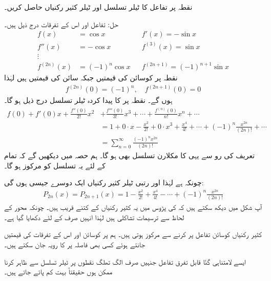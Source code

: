 نقطہ  پر تفاعل  کا ٹیلر تسلسل اور ٹیلر کثیر رکنیاں حاصل کریں۔

حل:\quad
تفاعل اور اس کے تفرقات درج ذیل ہیں۔
\begin{align*}
f(x)&=\cos x&& f'(x)=-\sin x\\
f''(x)&=-\cos x&&f^{(3)}(x)=\sin x\\
\vdots&\\
f^{(2n)}(x)&=(-1)^n \cos x&&f^{(2n+1)}=(-1)^{n+1}\sin x
\end{align*}
نقطہ  پر کوسائن کی قیمتیں  جبکہ سائن کی قیمتیں  ہیں لہٰذا
\begin{align*}
f^{(2n)}(0)=(-1)^n,\quad f^{(2n+1)}(0)=0
\end{align*}
ہوں گے۔ نقطہ  پر  کا پیدا کردہ ٹیلر تسلسل درج ذیل ہو گا۔
\begin{align*}
f(0)+f'(0)x+\frac{f''(0)}{2!}x^2&+\frac{f'''(0)}{3!}x^3+\cdots+\frac{f^{(n)}(0)}{n!}x^n+\cdots\\
&=1+0\cdot x-\frac{x^2}{2!}+0\cdot x^3+\frac{x^4}{4!}+\cdots+(-1)^n\frac{x^{2n}}{(2n)!}+\cdots\\
&=\sum_{n=0}^{\infty}\frac{(-1)^n x^{2n}}{(2n)!}
\end{align*}
تعریف کی رو سے یہی  کا مکلارن تسلسل بھی ہو گا۔ ہم حصہ  میں دیکھیں گے کہ تمام  کے لئے یہ تسلسل  کو مرکوز ہو گا۔

چونکہ  ہے لہٰذا  اور  رتبی ٹیلر کثیر رکنیاں ایک دوسرے جیسی ہوں گی:
\begin{align*}
P_{2n}(x)=P_{2n+1}(x)=1-\frac{x^2}{2!}+\frac{x^4}{4!}-\cdots+(-1)^n\frac{x^{2n}}{(2n)!}
\end{align*}
آپ شکل  میں دیکھ سکتے ہیں کہ  کی پڑوس میں یہ کثیر رکنیاں  کے کتنے قریب ہیں۔ چونکہ  محور کے لحاظ سے ترسیمات تشاکلی ہیں لہٰذا انہیں صرف  کے لئے دکھایا گیا ہے۔ 

کثیر رکنیاں  کوسائن تفاعل پر  کرنے سے مرکوز ہوتی ہیں۔ ہم  پر کوسائن اور اس کے تفرقات کی قیمتیں جانتے ہوئے کسی بھی فاصلہ پر  کا رویہ جان سکتے ہیں۔

ایسے لامتناہی گنّا قابل تفرق تفاعل جنہیں صرف الگ تھلگ نقطوں پر ٹیلر تسلسل سے ظاہر کرنا ممکن ہوں حقیقتاً بہت کم پائے جاتے ہیں۔

